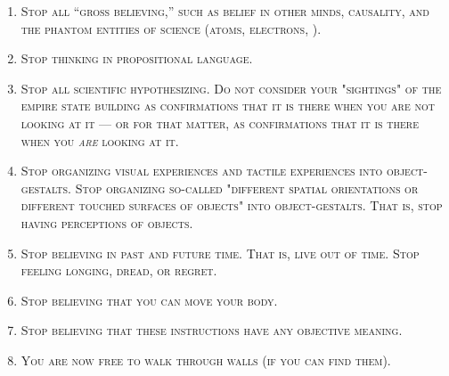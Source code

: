 
\begin{enumerate}

\item \textsc{ Stop all \enquote{gross believing,} such as belief in other minds, causality, and the phantom entities of science (atoms, electrons, \etc).}

\item \textsc{Stop thinking in propositional language.}

\item \textsc{Stop all scientific hypothesizing. Do not consider your "sightings" of the empire state building as confirmations that it is there when you are not looking at it --- or for that matter, as confirmations that it is there when you \emph{are} looking at it.}

\item \textsc{Stop organizing visual experiences and tactile experiences into object-gestalts. Stop organizing so-called "different spatial orientations or different touched surfaces of objects" into object-gestalts. That is, stop having perceptions of objects.}

\item \textsc{Stop believing in past and future time. That is, live out of time. Stop feeling longing, dread, or regret.}

\item \textsc{Stop believing that you can move your body.}

\item \textsc{Stop believing that these instructions have any objective meaning.}

\item \textsc{You are now free to walk through walls (if you can find them).}
\end{enumerate}

